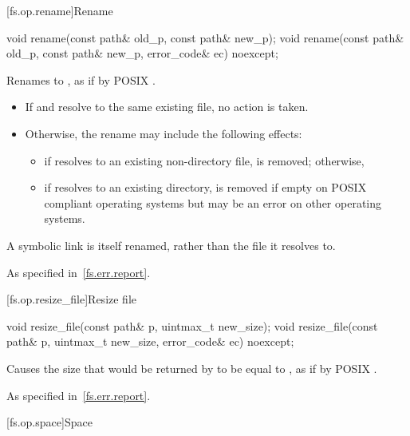 [fs.op.rename]{Rename}

%
\begin{itemdecl}
void rename(const path& old_p, const path& new_p);
void rename(const path& old_p, const path& new_p, error_code& ec) noexcept;
\end{itemdecl}

\begin{itemdescr}
\pnum
\effects Renames  to , as if by
  POSIX .

\begin{note}
\begin{itemize}
\item If  and  resolve to the same existing file,
   no action is taken.
\item Otherwise, the rename may include the following effects:
\begin{itemize}
\item if  resolves to an existing non-directory file,
     is removed; otherwise,
\item if  resolves to an existing directory,
     is removed if empty on POSIX compliant operating systems
    but may be an error on other operating systems.
\end{itemize}
\end{itemize}
A symbolic link is itself renamed, rather than the file it resolves to.
\end{note}

\pnum
\throws As specified in~\ref{fs.err.report}.
\end{itemdescr}


[fs.op.resize_file]{Resize file}

%
\begin{itemdecl}
void resize_file(const path& p, uintmax_t new_size);
void resize_file(const path& p, uintmax_t new_size, error_code& ec) noexcept;
\end{itemdecl}

\begin{itemdescr}
\pnum
\effects Causes the size that would be returned by  to be
equal to , as if by POSIX .

\pnum
\throws As specified in~\ref{fs.err.report}.
\end{itemdescr}


[fs.op.space]{Space}

